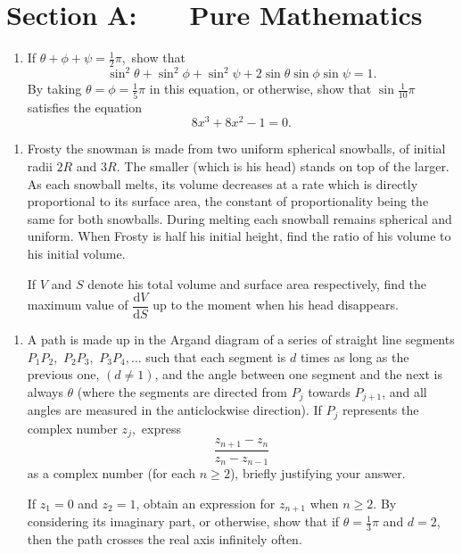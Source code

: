 \documentclass[a4, 11pt]{report}
\newlength{\qspace}
\newcounter{qnumber}
\newenvironment{question}%
 {\vspace{\qspace}
  \begin{enumerate}[\bfseries 1\quad][10]%
    \setcounter{enumi}{\value{qnumber}}%
    \item%
 }
{
  \end{enumerate}
  \filbreak
  \stepcounter{qnumber}
 }
\begin{document}
\setcounter{page}{2}

 
\section*{Section A: \ \ \ Pure Mathematics}

\begin{question}
If $\theta+\phi+\psi=\tfrac{1}{2}\pi,$ show that 
\[
\sin^{2}\theta+\sin^{2}\phi+\sin^{2}\psi+2\sin\theta\sin\phi\sin\psi=1.
\]
By taking $\theta=\phi=\tfrac{1}{5}\pi$ in this equation, or otherwise,
show that $\sin\tfrac{1}{10}\pi$ satisfies the equation 
\[
8x^{3}+8x^{2}-1=0.
\]
\end{question}

\begin{question}
Frosty the snowman is made from two uniform spherical snowballs, of
initial radii $2R$ and $3R.$ The smaller (which is his head) stands
on top of the larger. As each snowball melts, its volume decreases
at a rate which is directly proportional to its surface area, the
constant of proportionality being the same for both snowballs. During
melting each snowball remains spherical and uniform. When Frosty is
half his initial height, find the ratio of his volume to his initial
volume. 


If $V$ and $S$ denote his total volume and surface area respectively,
find the maximum value of $\dfrac{\mathrm{d}V}{\mathrm{d}S}$ up to
the moment when his head disappears.
\end{question}

\begin{question}
A path is made up in the Argand diagram of a series of straight line
segments $P_{1}P_{2},$ $P_{2}P_{3},$ $P_{3}P_{4},\ldots$ such that
each segment is $d$ times as long as the previous one, $(d\neq1)$,
and the angle between one segment and the next is always $\theta$
(where the segments are directed from $P_{j}$ towards $P_{j+1}$,
and all angles are measured in the anticlockwise direction). If $P_{j}$
represents the complex number $z_{j},$ express 
\[
\frac{z_{n+1}-z_{n}}{z_{n}-z_{n-1}}
\]
as a complex number (for each $n\geqslant2$), briefly justifying
your answer. 


If $z_{1}=0$ and $z_{2}=1$, obtain an expression for $z_{n+1}$
when $n\geqslant2$. By considering its imaginary part, or otherwise,
show that if $\theta=\frac{1}{3}\pi$ and $d=2$, then the path crosses
the real axis infinitely often.  
\end{question}
\end{document}

